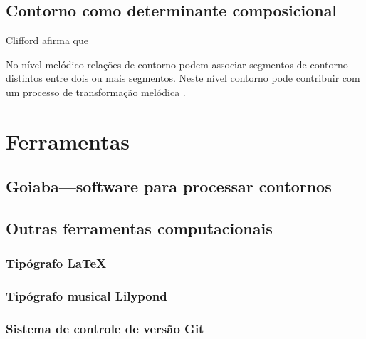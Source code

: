 \section{Contorno como determinante composicional}
\label{sec:cont-como-determ}

Clifford afirma que



No nível melódico relações de contorno podem associar segmentos de
contorno distintos entre dois ou mais segmentos. Neste nível contorno
pode contribuir com um processo de transformação melódica
\cite[p. 159]{clifford95:contour}.

\chapter{Ferramentas}
\label{cha:ferramentas}

\section{Goiaba---software para processar contornos}
\label{sec:goiaba-software-para}

\section{Outras ferramentas computacionais}
\label{sec:outr-ferr-comp}

\subsection{Tipógrafo \LaTeX{}}
\label{sec:latex}

\subsection{Tipógrafo musical Lilypond}
\label{sec:tipogr-music-lilyp}

\subsection{Sistema de controle de versão Git}
\label{sec:sistema-de-controle}

